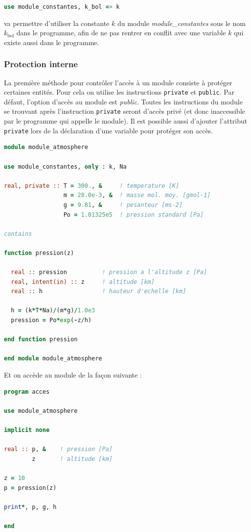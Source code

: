 \documentclass[a4paper,twoside]{article}
\begin{document}
\begin{exemple}
\begin{lstlisting}[language=Fortran]
use module_constantes, k_bol => k
\end{lstlisting}
va permettre d'utiliser la constante $k$ du module \emph{module\_constantes} sous le nom $k_\text{bol}$ dans le programme, afin de ne pas rentrer en conflit avec une variable $k$ qui existe aussi dans le programme.
\end{exemple}


\subsubsection{Protection interne}
La première méthode pour contrôler l'accès à un module consiste à protéger certaines entités. Pour cela on utilise les instructions \texttt{private} et \texttt{public}. Par défaut, l'option d'accès au module est \emph{public}. Toutes les instructions du module se trouvant après l'instruction \texttt{private} seront d'accès privé (et donc inaccessible par le programme qui appelle le module). Il est possible aussi d'ajouter l'attribut \texttt{private} lors de la déclaration d'une variable pour protéger son accès.

\begin{lstlisting}[language=Fortran]
module module_atmosphere

use module_constantes, only : k, Na

real, private :: T = 300., &     ! temperature [K]
                 m = 28.0e-3, &  ! masse mol. moy. [gmol-1]
                 g = 9.81, &     ! pesanteur [ms-2]
                 Po = 1.01325e5  ! pression standard [Pa]

contains

function pression(z)

  real :: pression          ! pression a l'altitude z [Pa]
  real, intent(in) :: z     ! altitude [km]
  real :: h                 ! hauteur d'echelle [km]

  h = (k*T*Na)/(m*g)/1.0e3
  pression = Po*exp(-z/h)

end function pression

end module module_atmosphere
\end{lstlisting}

Et on accède au module de la façon suivante : 
\begin{lstlisting}[language=Fortran]
program acces

use module_atmosphere

implicit none

real :: p, &    ! pression [Pa]
        z       ! altitude [km]

z = 10
p = pression(z)

print*, p, g, h

end
\end{lstlisting}
\end{document}
